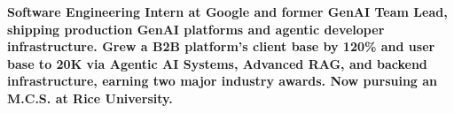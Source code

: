 \item\small{\textbf{Software Engineering Intern at Google and former GenAI Team Lead, shipping production GenAI platforms and agentic developer infrastructure. Grew a B2B platform's client base by 120\% and user base to 20K via Agentic AI Systems, Advanced RAG, and backend infrastructure, earning two major industry awards. Now pursuing an M.C.S. at Rice University.}}%
